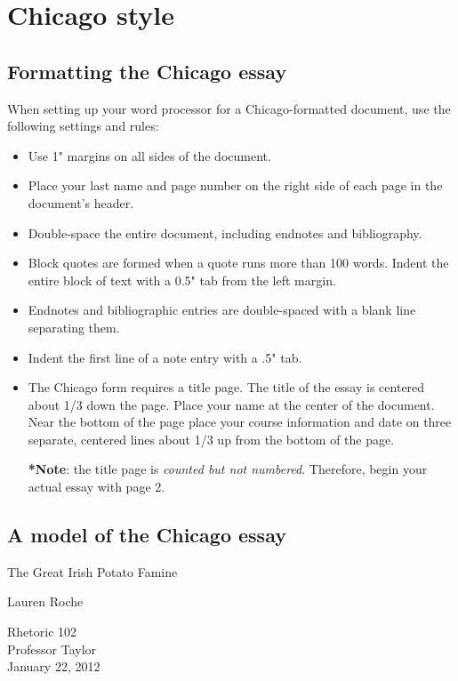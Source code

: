 
\chapter{Chicago style}

\section{Formatting the Chicago essay}

When setting up your word processor for a Chicago-formatted document, use the 
following settings and rules:

\begin{itemize}
\item Use 1" margins on all sides of the document.
\item Place your last name and page number on the right side of each page in the 
document's header.
\item Double-space the entire document, including endnotes and bibliography.
\item Block quotes are formed when a quote runs more than 100 words. Indent the entire 
block of text with a 0.5" tab from the left margin.
\item Endnotes and bibliographic entries are double-spaced with a blank line separating 
them.
\item Indent the first line of a note entry with a .5" tab.
\item The Chicago form requires a title page. The title of the essay is centered about 
1/3 down the page. Place your name at the center of the document. Near the bottom 
of the page place your course information and date on three separate, centered lines 
about 1/3 up from the bottom of the page.

\textbf{*}\textbf{Note}: the title page is \emph{counted but not numbered}. Therefore, 
begin your actual essay with page 2.
\end{itemize}

\section{A model of the Chicago essay}

\newpage
\thispagestyle{empty}
\begin{Spacing}{2}
\vspace* {3cm}
\begin{center}The Great Irish Potato Famine\end{center}
\vspace {4cm}
\begin{center}Lauren Roche\end{center}
\vspace {5cm}
\begin{center}Rhetoric 102\\
Professor Taylor\\
January 22, 2012\end{center}
\end{Spacing}
\newpage

